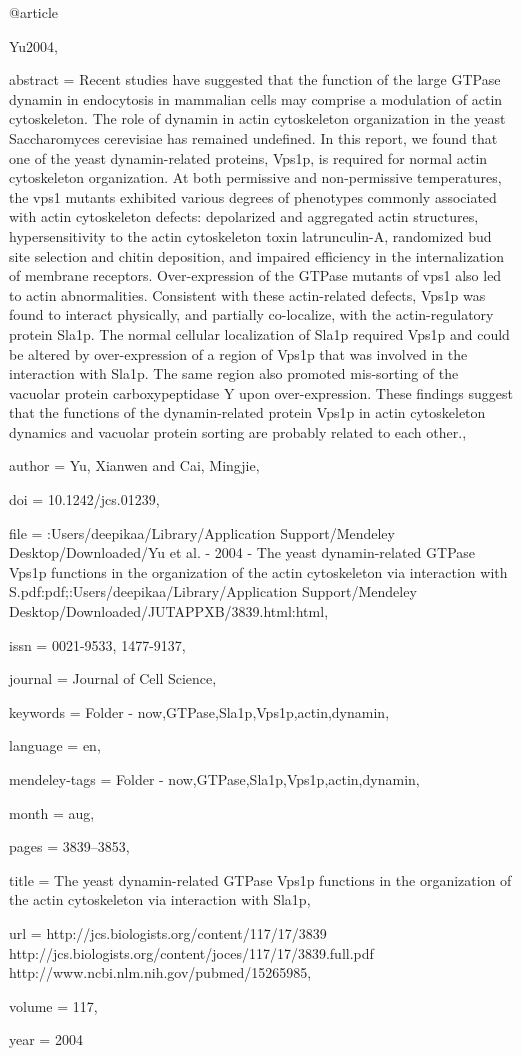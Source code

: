 @article{Yu2004,

abstract = {Recent studies have suggested that the function of the large GTPase dynamin in endocytosis in mammalian cells may comprise a modulation of actin cytoskeleton. The role of dynamin in actin cytoskeleton organization in the yeast Saccharomyces cerevisiae has remained undefined. In this report, we found that one of the yeast dynamin-related proteins, Vps1p, is required for normal actin cytoskeleton organization. At both permissive and non-permissive temperatures, the vps1 mutants exhibited various degrees of phenotypes commonly associated with actin cytoskeleton defects: depolarized and aggregated actin structures, hypersensitivity to the actin cytoskeleton toxin latrunculin-A, randomized bud site selection and chitin deposition, and impaired efficiency in the internalization of membrane receptors. Over-expression of the GTPase mutants of vps1 also led to actin abnormalities. Consistent with these actin-related defects, Vps1p was found to interact physically, and partially co-localize, with the actin-regulatory protein Sla1p. The normal cellular localization of Sla1p required Vps1p and could be altered by over-expression of a region of Vps1p that was involved in the interaction with Sla1p. The same region also promoted mis-sorting of the vacuolar protein carboxypeptidase Y upon over-expression. These findings suggest that the functions of the dynamin-related protein Vps1p in actin cytoskeleton dynamics and vacuolar protein sorting are probably related to each other.},

author = {Yu, Xianwen and Cai, Mingjie},

doi = {10.1242/jcs.01239},

file = {:Users/deepikaa/Library/Application Support/Mendeley Desktop/Downloaded/Yu et al. - 2004 - The yeast dynamin-related GTPase Vps1p functions in the organization of the actin cytoskeleton via interaction with S.pdf:pdf;:Users/deepikaa/Library/Application Support/Mendeley Desktop/Downloaded/JUTAPPXB/3839.html:html},

issn = {0021-9533, 1477-9137},

journal = {Journal of Cell Science},

keywords = {Folder - now,GTPase,Sla1p,Vps1p,actin,dynamin},

language = {en},

mendeley-tags = {Folder - now,GTPase,Sla1p,Vps1p,actin,dynamin},

month = {aug},

pages = {3839--3853},

title = {{The yeast dynamin-related GTPase Vps1p functions in the organization of the actin cytoskeleton via interaction with Sla1p}},

url = {http://jcs.biologists.org/content/117/17/3839 http://jcs.biologists.org/content/joces/117/17/3839.full.pdf http://www.ncbi.nlm.nih.gov/pubmed/15265985},

volume = {117},

year = {2004}

}

